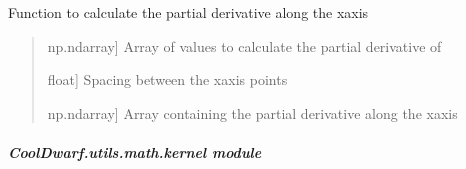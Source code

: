 \documentclass[letterpaper,10pt,english]{sphinxmanual}
\begin{document}

\begin{fulllineitems}
\label{\detokenize{CoolDwarf.utils.math:CoolDwarf.utils.math.calc.partial_derivative_x}}
\pysigstartsignatures
{}
\pysigstopsignatures
\sphinxAtStartPar
Function to calculate the partial derivative along the x\sphinxhyphen{}axis
\begin{quote}\begin{description}
\begin{description}
\sphinxlineitem{\sphinxstylestrong{var}}{[}np.ndarray{]}
\sphinxAtStartPar
Array of values to calculate the partial derivative of

\sphinxlineitem{\sphinxstylestrong{dx}}{[}float{]}
\sphinxAtStartPar
Spacing between the x\sphinxhyphen{}axis points

\end{description}

\begin{description}
\sphinxlineitem{\sphinxstylestrong{partial\_x}}{[}np.ndarray{]}
\sphinxAtStartPar
Array containing the partial derivative along the x\sphinxhyphen{}axis

\end{description}

\end{description}\end{quote}

\end{fulllineitems}



\subparagraph{CoolDwarf.utils.math.kernel module}
\label{\detokenize{CoolDwarf.utils.math:module-CoolDwarf.utils.math.kernel}}\label{\detokenize{CoolDwarf.utils.math:cooldwarf-utils-math-kernel-module}}
\end{document}

